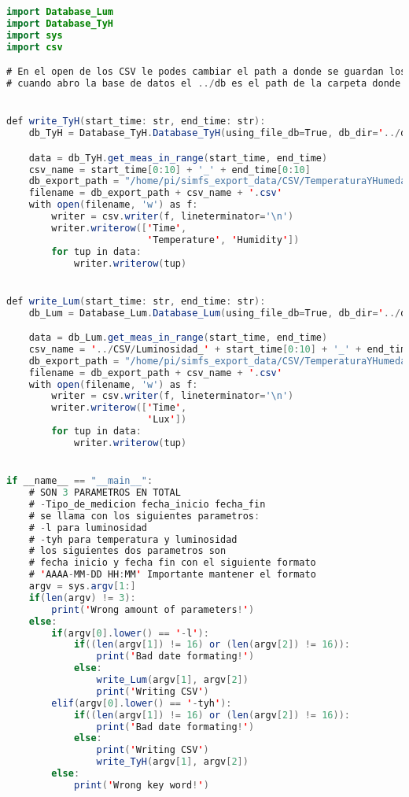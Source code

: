 
\begin{lstlisting}[language=Java]
import Database_Lum
import Database_TyH
import sys
import csv

# En el open de los CSV le podes cambiar el path a donde se guardan los CSV generados, tambien ahi le podes cambiar el terminador de linea y el separador
# cuando abro la base de datos el ../db es el path de la carpeta donde estan las bases de datos


def write_TyH(start_time: str, end_time: str):
    db_TyH = Database_TyH.Database_TyH(using_file_db=True, db_dir='../db')

    data = db_TyH.get_meas_in_range(start_time, end_time)
    csv_name = start_time[0:10] + '_' + end_time[0:10]
    db_export_path = "/home/pi/simfs_export_data/CSV/TemperaturaYHumedad_"
    filename = db_export_path + csv_name + '.csv'
    with open(filename, 'w') as f:
        writer = csv.writer(f, lineterminator='\n')
        writer.writerow(['Time',
                         'Temperature', 'Humidity'])
        for tup in data:
            writer.writerow(tup)


def write_Lum(start_time: str, end_time: str):
    db_Lum = Database_Lum.Database_Lum(using_file_db=True, db_dir='../db')

    data = db_Lum.get_meas_in_range(start_time, end_time)
    csv_name = '../CSV/Luminosidad_' + start_time[0:10] + '_' + end_time[0:10]
    db_export_path = "/home/pi/simfs_export_data/CSV/TemperaturaYHumedad_"
    filename = db_export_path + csv_name + '.csv'
    with open(filename, 'w') as f:
        writer = csv.writer(f, lineterminator='\n')
        writer.writerow(['Time',
                         'Lux'])
        for tup in data:
            writer.writerow(tup)


if __name__ == "__main__":
    # SON 3 PARAMETROS EN TOTAL
    # -Tipo_de_medicion fecha_inicio fecha_fin
    # se llama con los siguientes parametros:
    # -l para luminosidad
    # -tyh para temperatura y luminosidad
    # los siguientes dos parametros son
    # fecha inicio y fecha fin con el siguiente formato
    # 'AAAA-MM-DD HH:MM' Importante mantener el formato
    argv = sys.argv[1:]
    if(len(argv) != 3):
        print('Wrong amount of parameters!')
    else:
        if(argv[0].lower() == '-l'):
            if((len(argv[1]) != 16) or (len(argv[2]) != 16)):
                print('Bad date formating!')
            else:
                write_Lum(argv[1], argv[2])
                print('Writing CSV')
        elif(argv[0].lower() == '-tyh'):
            if((len(argv[1]) != 16) or (len(argv[2]) != 16)):
                print('Bad date formating!')
            else:
                print('Writing CSV')
                write_TyH(argv[1], argv[2])
        else:
            print('Wrong key word!')


\end{lstlisting}

